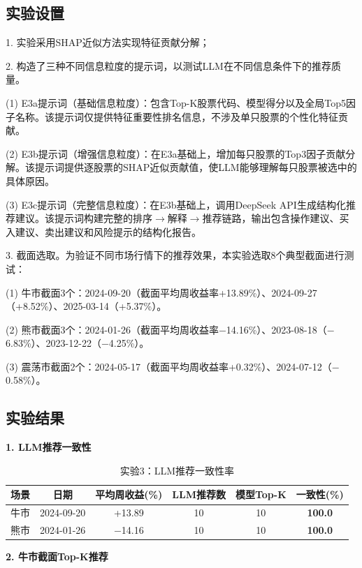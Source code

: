 \documentclass[11pt,a4paper]{ctexart}
\newcommand{\best}[1]{\textcolor{bestval}{\textbf{#1}}}
\begin{document}
\subsection{实验设置}

1. 实验采用SHAP近似方法实现特征贡献分解；

2. 构造了三种不同信息粒度的提示词，以测试LLM在不同信息条件下的推荐质量。

(1) E3a提示词（基础信息粒度）：包含Top-K股票代码、模型得分以及全局Top5因子名称。该提示词仅提供特征重要性排名信息，不涉及单只股票的个性化特征贡献。

(2) E3b提示词（增强信息粒度）：在E3a基础上，增加每只股票的Top3因子贡献分解。该提示词提供逐股票的SHAP近似贡献值，使LLM能够理解每只股票被选中的具体原因。

(3) E3c提示词（完整信息粒度）：在E3b基础上，调用DeepSeek API生成结构化推荐建议。该提示词构建完整的排序$\to$解释$\to$推荐链路，输出包含操作建议、买入建议、卖出建议和风险提示的结构化报告。

3. 截面选取。为验证不同市场行情下的推荐效果，本实验选取8个典型截面进行测试：

(1) 牛市截面3个：2024-09-20（截面平均周收益率+13.89\%）、2024-09-27（+8.52\%）、2025-03-14（+5.37\%）。

(2) 熊市截面3个：2024-01-26（截面平均周收益率$-$14.16\%）、2023-08-18（$-$6.83\%）、2023-12-22（$-$4.25\%）。

(3) 震荡市截面2个：2024-05-17（截面平均周收益率+0.32\%）、2024-07-12（$-$0.58\%）。

\subsection{实验结果}

\textbf{1. LLM推荐一致性}

\begin{table}[htbp]
\centering
\caption{实验3：LLM推荐一致性率}
\label{tab:exp3-consistency}
\begin{tabular}{lccccc}
\toprule
\textbf{场景} & \textbf{日期} & \textbf{平均周收益(\%)} & \textbf{LLM推荐数} & \textbf{模型Top-K} & \textbf{一致性(\%)} \\
\midrule
牛市 & 2024-09-20 & +13.89 & 10 & 10 & \best{100.0} \\
熊市 & 2024-01-26 & $-$14.16 & 10 & 10 & \best{100.0} \\
\bottomrule
\end{tabular}
\end{table}

\textbf{2. 牛市截面Top-K推荐}
\end{document}
